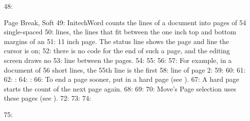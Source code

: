 48: \begin{Feature}{Page Break, Soft}
49: InitechWord counts the lines of a document into pages of 54 single-spaced
50: lines, the lines that fit between the one inch top and bottom margins of an
51: 11 inch page.  The status line shows the page and line the cursor is on;
52: there is no code for the end of such a page, and the editing screen draws no
53: line between the pages.
54: 
55: 
56: %
57: For example, in a document of 56 short lines, the 55th line is the first
58: line of page 2:
59: %
60: %
61: 
62: : 
64: : 
66: To end a page sooner, put in a hard page (see ).
67: A hard page starts the count of the next page again.
68: 
69: 
70: Move's Page selection uses these pages (see ).
72: 
73: 
74: \end{Feature}
75: 
